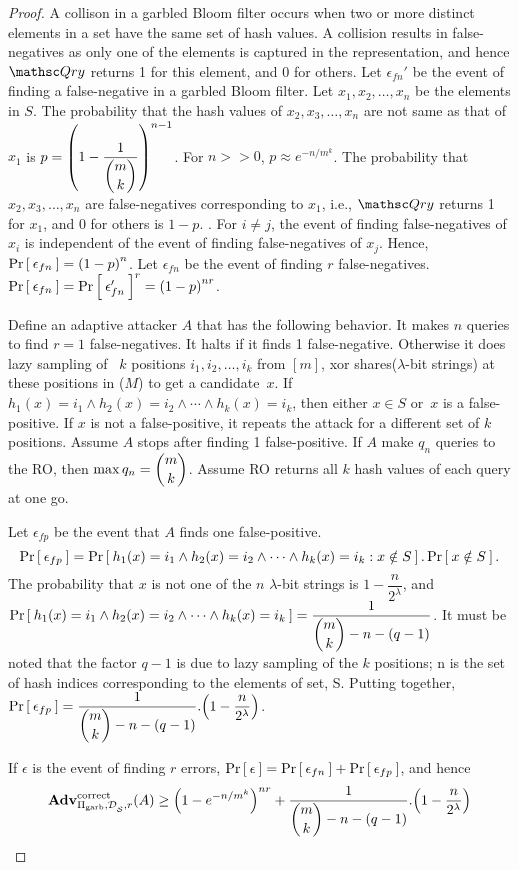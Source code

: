 \begin{proof}%
A collison in a garbled Bloom filter occurs when two or more distinct elements in a set have the same set of hash values. A collision results in false-negatives as only one of the elements is captured in the representation, and hence $\Qry$ returns 1 for this element, and 0 for others. Let $\epsilon_{fn}'$ be the event of finding a false-negative in a garbled Bloom filter.  Let $x_1,x_2,\ldots,x_n$ be the elements in $S$. The probability that the hash values of $x_2,x_3,\ldots,x_n$ are not same as that of $x_1$ is $p = \left( 1-\dfrac{1}{\dbinom{m}{k}} \right)^{n-1}$. For $n >> 0$, $p \approx  e^{-n/m^k}$. The probability that $x_2,x_3,\ldots,x_n$ are false-negatives corresponding to $x_1$, i.e., $\Qry$ returns 1 for $x_1$, and 0 for others is $1-p$. %
. For $i \neq j$, the event of finding false-negatives of $x_i$ is independent of the event of finding false-negatives of $x_j$. Hence, $\Pr\left[\: \epsilon_{fn} \:\right] = \left( 1-p \right)^n$. Let $\epsilon_{fn}$ be the event of finding $r$ false-negatives. $\Pr\left[\: \epsilon_{fn} \:\right] = \Pr\left[\: \epsilon_{fn}' \:\right]^{r} = \left( 1-p \right)^{nr}$.

Define an adaptive attacker $A$ that has the following behavior. It makes $n$ queries to find $r=1$ false-negatives. It halts if it finds 1 false-negative. Otherwise it does lazy sampling of ~$k$ positions $i_1,i_2,\ldots,i_k$ from $[m]$, xor shares($\lambda$-bit strings) at these positions in ($M$) to get a candidate~$x$.  If $h_{1}(x)=i_1 \wedge h_2(x)=i_2 \wedge \cdots \wedge h_k(x) = i_k$, then either $x \in S$ or~$x$ is a false-positive. If $x$ is not a false-positive, it repeats the attack for a different set of $k$ positions. Assume $A$ stops after finding 1 false-positive. If $A$ make $q_n$ queries to the RO, then $\max{q_n} = \dbinom{m}{k}$. Assume RO returns all $k$ hash values of each query at one go.

Let $\epsilon_{fp}$ be the event that $A$ finds one false-positive. 
 $$\Pr\left[\: \epsilon_{fp} \:\right] = \Pr\left[\: h_{1}(x)=i_1 \wedge h_2(x)=i_2 \wedge \cdots \wedge h_k(x) = i_k : x \notin S \:\right].\Pr\left[\: x \notin S \:\right].$$
 The probability that $x$ is not one of the $n$ $\lambda$-bit strings is $1-\dfrac{n}{2^\lambda}$, and $ \Pr\left[\: h_{1}(x)=i_1 \wedge h_2(x)=i_2 \wedge \cdots \wedge\\ h_k(x) = i_k \:\right] = \dfrac{1}{\dbinom{m}{k}-n-(q-1)}$. It must be noted that the factor $q-1$ is due to lazy sampling of the $k$ positions; n is the set of hash indices corresponding to the elements of set, S. Putting together, $\Pr\left[\: \epsilon_{fp} \:\right] =  \dfrac{1}{\dbinom{m}{k}-n-(q-1)} . \Big(1-\dfrac{n}{2^\lambda}\Big)$. 

If $\epsilon$ is the event of finding $r$ errors, $\Pr\left[\: \epsilon \:\right] = \Pr\left[\: \epsilon_{fn} \:\right] + \Pr\left[\: \epsilon_{fp} \:\right]$, and hence 
\[
\mathrm{\mathbf{Adv}}^{\mathrm{correct}}_{\Pi_{\mathrm{garb}},\mathcal{D}_{{\cal S}}^{},r}(A)  \geq \left(1 - e^{-n/m^k}\right)^{nr} + \dfrac{1}{\dbinom{m}{k}-n-(q-1)} . \Big(1-\dfrac{n}{2^\lambda}\Big)
\]



\end{proof}
